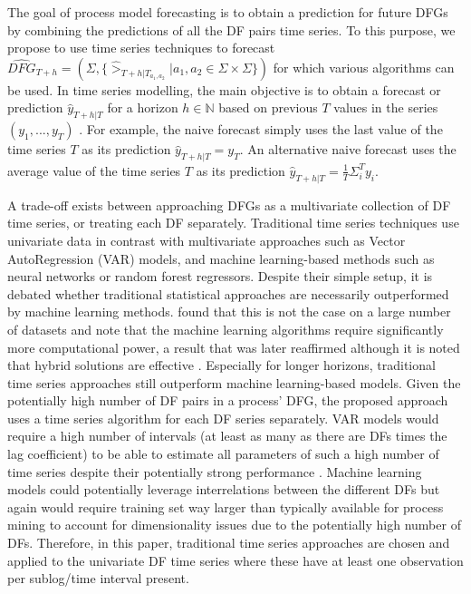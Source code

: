 The goal of process model forecasting is to obtain a prediction for future DFGs by combining the predictions of all the DF pairs time series.
To this purpose, we propose to use time series techniques to forecast $\widehat{DFG}_{T+h}=(\Sigma,\{\hat{>}_{T+h|T_{a_1,a_2}}|a_1,a_2\in \Sigma\times\Sigma\})$ for which various algorithms can be used.
In time series modelling, the main objective is to obtain a forecast or prediction $\hat{y}_{T+h|T}$ for a horizon $h\in \mathbb{N}$ based on previous $T$ values in the series $(y_1,...,y_T)$ \cite{hyndman2018forecasting}.
For example, the naive forecast simply uses the last value of the time series $T$ as its prediction $\hat{y}_{T+h|T}=y_T$.
An alternative naive forecast uses the average value of the time series $T$ as its prediction $\hat{y}_{T+h|T}=\frac{1}{T}\Sigma_i^{T} y_i$.

A trade-off exists between approaching DFGs as a multivariate collection of DF time series, or treating each DF separately.
Traditional time series techniques use univariate data in contrast with multivariate approaches such as Vector AutoRegression (VAR) models, and machine learning-based methods such as neural networks or random forest regressors.
Despite their simple setup, it is debated whether traditional statistical approaches are necessarily outperformed by machine learning methods. 
\cite{makridakis2018statistical} found that this is not the case on a large number of datasets and note that the machine learning algorithms require significantly more computational power, a result that was later reaffirmed although it is noted that hybrid solutions are effective \cite{makridakis2020m4}.
Especially for longer horizons, traditional time series approaches still outperform machine learning-based models.
Given the potentially high number of DF pairs in a process' DFG, the proposed approach uses a time series algorithm for each DF series separately.
VAR models would require a high number of intervals (at least as many as there are DFs times the lag coefficient) to be able to estimate all parameters of such a high number of time series despite their potentially strong performance \cite{thomakos2004naive}.
Machine learning models could potentially leverage interrelations between the different DFs but again would require training set way larger than typically available for process mining to account for dimensionality issues due to the potentially high number of DFs. 
Therefore, in this paper, traditional time series approaches are chosen and applied to the univariate DF time series where these have at least one observation per sublog/time interval present.

